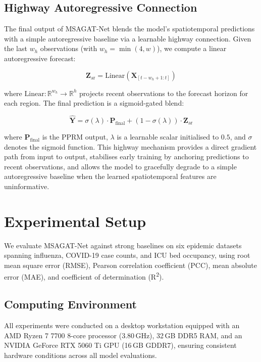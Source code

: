 \documentclass[a4paper,fleqn]{cas-dc}
\begin{document}
\subsection{Highway Autoregressive Connection}

The final output of MSAGAT-Net blends the model's spatiotemporal predictions with a simple autoregressive baseline via a learnable highway connection. Given the last $w_h$ observations (with $w_h = \min(4, w)$), we compute a linear autoregressive forecast:

\begin{equation}
\mathbf{Z}_{\text{ar}} = \text{Linear}(\mathbf{X}_{[t-w_h+1:t]})
\end{equation}

where $\text{Linear}: \mathbb{R}^{w_h} \to \mathbb{R}^{h}$ projects recent observations to the forecast horizon for each region. The final prediction is a sigmoid-gated blend:

\begin{equation}
\hat{\mathbf{Y}} = \sigma(\lambda) \cdot \mathbf{P}_{\text{final}} + (1 - \sigma(\lambda)) \cdot \mathbf{Z}_{\text{ar}}
\end{equation}

where $\mathbf{P}_{\text{final}}$ is the PPRM output, $\lambda$ is a learnable scalar initialised to $0.5$, and $\sigma$ denotes the sigmoid function. This highway mechanism provides a direct gradient path from input to output, stabilises early training by anchoring predictions to recent observations, and allows the model to gracefully degrade to a simple autoregressive baseline when the learned spatiotemporal features are uninformative.

\section{Experimental Setup}
\label{sec:experiments}

We evaluate MSAGAT-Net against strong baselines on six epidemic datasets spanning influenza, COVID-19 case counts, and ICU bed occupancy, using root mean square error (RMSE), Pearson correlation coefficient (PCC), mean absolute error (MAE), and coefficient of determination (R\textsuperscript{2}).

\subsection{Computing Environment}
\label{sec:experimental_setup}

All experiments were conducted on a desktop workstation equipped with an AMD Ryzen 7 7700 8-core processor (3.80\,GHz), 32\,GB DDR5 RAM, and an NVIDIA GeForce RTX 5060 Ti GPU (16\,GB GDDR7), ensuring consistent hardware conditions across all model evaluations.
\end{document}
